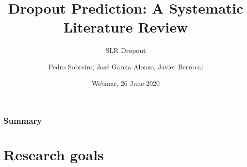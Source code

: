 \documentclass[10pt]{beamer}
\title[Dropout Prediction]{Dropout Prediction: A Systematic Literature Review}
\subtitle{SLR Dropout}
\author{Pedro Sobreiro, José Garcia Alonso, Javier Berrocal} %
\institute[UNEX] %
{ 
University of Extremadura ~~~~~~~~~~~~~~~%
\medskip
\textit{pdealexa@alumnos.unex.es} %
}
\date{Webinar, 26 June 2020} %
\begin{document}
\begin{frame}
	\titlepage %
\end{frame}

\begin{frame}
\frametitle{Summary} %
\tableofcontents %

\end{frame}


\section{Research goals} %

\end{document}
